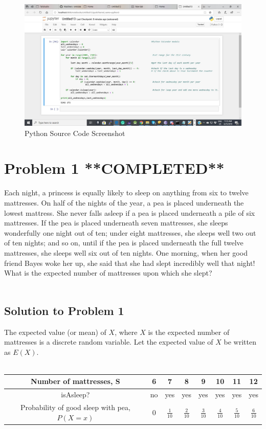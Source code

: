 \documentclass{article}
\begin{document}
\begin{figure}[H]
	\centering
	\includegraphics[width=1.2\linewidth, height=0.6\textheight]{pythonCode2}
	\caption{Python Source Code Screenshot}
	\label{fig:pythoncode}
\end{figure}

\section{Problem 1 **COMPLETED**}
Each night, a princess is equally likely to sleep on anything from six to twelve mattresses. On half of the nights of the year, a pea is placed underneath the lowest mattress. She never falls asleep if a pea is placed underneath a pile of six mattresses. If the pea is placed underneath seven mattresses, she sleeps wonderfully one night out of ten; under eight mattresses, she sleeps well two out of ten nights; and so on, until if the pea is placed underneath the full twelve mattresses, she sleeps well six out of ten nights. One morning, when her good friend Bayes woke her up, she said that she had slept incredibly well that night! What is the expected number of mattresses upon which she slept? \\\\
\subsection{Solution to Problem 1}
The expected value (or mean) of $X$, where $X$ is the expected number of mattresses is a discrete random variable. Let the expected value of $X$ be written as $E(X)$. \\\\


\begin{tabular}{|c|c|c|c|c|c|c|c|}
	\hline 
	Number of mattresses, S& 6 &7  & 8 & 9 &10  &11  & 12 \\ 
	\hline 
	isAsleep?& no & yes & yes & yes & yes & yes & yes \\ 
	\hline 
	Probability of good sleep with pea, $P(X=x)$& 0 & $\frac{1}{10}$ & $\frac{2}{10}$ & $\frac{3}{10}$ & $\frac{4}{10}$ & $\frac{5}{10}$ & $\frac{6}{10}$ \\ 
	\hline 
\end{tabular} \\\\
\end{document}
